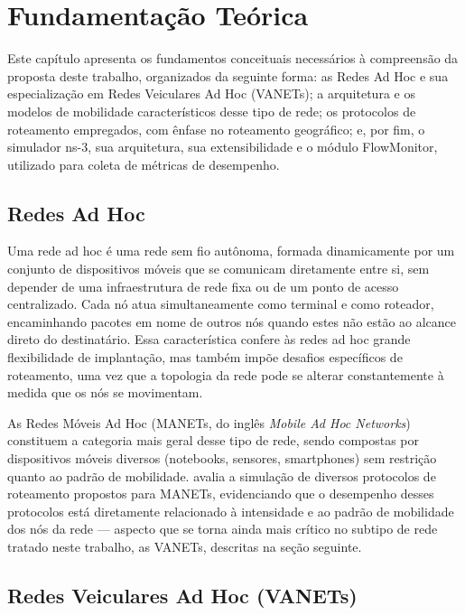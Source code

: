 \chapter{Fundamentação Teórica}
\label{cap:fundamentacao}

Este capítulo apresenta os fundamentos conceituais necessários à compreensão da proposta
deste trabalho, organizados da seguinte forma: as Redes Ad Hoc e sua especialização em
Redes Veiculares Ad Hoc (VANETs); a arquitetura e os modelos de mobilidade característicos
desse tipo de rede; os protocolos de roteamento empregados, com ênfase no roteamento
geográfico; e, por fim, o simulador ns-3, sua arquitetura, sua extensibilidade e o módulo
FlowMonitor, utilizado para coleta de métricas de desempenho.

\section{Redes Ad Hoc}
\label{sec:redes-ad-hoc}

Uma rede ad hoc é uma rede sem fio autônoma, formada dinamicamente por um conjunto de
dispositivos móveis que se comunicam diretamente entre si, sem depender de uma
infraestrutura de rede fixa ou de um ponto de acesso centralizado. Cada nó atua
simultaneamente como terminal e como roteador, encaminhando pacotes em nome de outros nós
quando estes não estão ao alcance direto do destinatário. Essa característica confere às
redes ad hoc grande flexibilidade de implantação, mas também impõe desafios específicos de
roteamento, uma vez que a topologia da rede pode se alterar constantemente à medida que os
nós se movimentam.

As Redes Móveis Ad Hoc (MANETs, do inglês \textit{Mobile Ad Hoc Networks}) constituem a
categoria mais geral desse tipo de rede, sendo compostas por dispositivos móveis diversos
(notebooks, sensores, smartphones) sem restrição quanto ao padrão de mobilidade.
 avalia a simulação de diversos protocolos de roteamento
propostos para MANETs, evidenciando que o desempenho desses protocolos está diretamente
relacionado à intensidade e ao padrão de mobilidade dos nós da rede — aspecto que se torna
ainda mais crítico no subtipo de rede tratado neste trabalho, as VANETs, descritas na seção
seguinte.

\section{Redes Veiculares Ad Hoc (VANETs)}
\label{sec:vanets}

